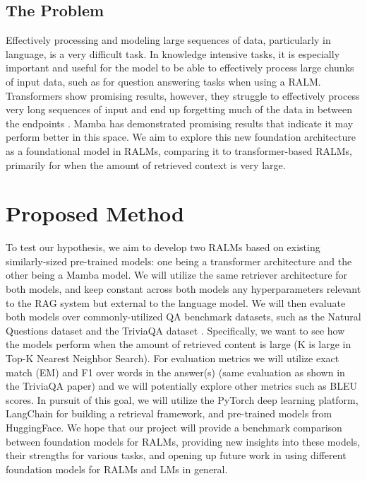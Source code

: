 \documentclass[11pt]{article}
\begin{document}
\subsection{The Problem}
Effectively processing and modeling large sequences of data, particularly in language, is a very difficult task. In knowledge intensive tasks, it is especially important and useful for the model to be able to effectively process large chunks of input data, such as for question answering tasks when using a RALM. Transformers show promising results, however, they struggle to effectively process very long sequences of input and end up forgetting much of the data in between the endpoints \cite{tay2020long}. Mamba \cite{gu2023mamba} has demonstrated promising results that indicate it may perform better in this space. We aim to explore this new foundation architecture as a foundational model in RALMs, comparing it to transformer-based RALMs, primarily for when the amount of retrieved context is very large.

\section{Proposed Method}
To test our hypothesis, we aim to develop two RALMs based on existing similarly-sized pre-trained models: one being a transformer architecture and the other being a Mamba model. We will utilize the same retriever architecture for both models, and keep constant across both models any hyperparameters relevant to the RAG system but external to the language model. We will then evaluate both models over commonly-utilized QA benchmark datasets, such as the Natural Questions dataset \cite{kwiatkowski-etal-2019-natural} and the TriviaQA dataset \cite{Joshi2017TriviaQAAL}. Specifically, we want to see how the models perform when the amount of retrieved content is large (K is large in Top-K Nearest Neighbor Search). For evaluation metrics we will utilize exact match (EM) and F1 over words in the answer(s) (same evaluation as shown in the TriviaQA paper) and we will potentially explore other metrics such as BLEU scores. In pursuit of this goal, we will utilize the PyTorch deep learning platform, LangChain for building a retrieval framework, and pre-trained models from HuggingFace. We hope that our project will provide a benchmark comparison between foundation models for RALMs, providing new insights into these models, their strengths for various tasks, and opening up future work in using different foundation models for RALMs and LMs in general.
\end{document}
